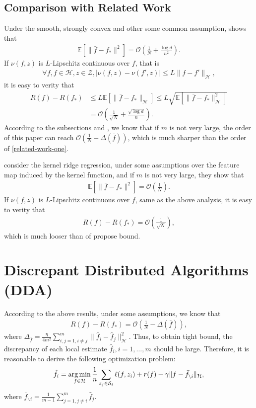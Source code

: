 \documentclass{article}
\newcommand{\argmin}{\operatornamewithlimits{arg\,min}}
\begin{document}
\subsection{Comparison with Related Work}
Under the smooth, strongly convex and other some common assumption,
\cite{zhang2012communication} shows that
\begin{align}
  \mathbb{E}\left[\|\bar{f}-f_\ast\|^2\right]=\mathcal{O}\left(\frac{1}{N}+\frac{\log d}{n^2}\right).
\end{align}
If $\nu(f,z)$ is $L$-Lipschitz continuous over $f$, that is
\begin{align*}
  \forall f, f\in \mathcal{H}, z\in\mathcal{Z}, |\nu(f,z)-\nu(f',z)|\leq L\|f-f'\|_\mathcal{H},
\end{align*}
it is easy to verity that
\begin{align}
  \nonumber R(f)-R(f_\ast)&\leq L\mathbb{E}\left[\|\bar{f}-f_\ast\|_\mathcal{H}\right]\leq L\sqrt{\mathbb{E}\left[\|\bar{f}-f_\ast\|^2_\mathcal{H}\right]}\\
  \label{related-work-one}    &= \mathcal{O}\left(\frac{1}{\sqrt{N}}+\frac{\sqrt{\log d}}{n}\right).
\end{align}
According to the subsections \label{subsection-3.1} and \label{subsection-3.2},
we know that if $m$ is not very large,
the order of this paper can reach $\mathcal{O}\left(\frac{1}{N}-\Delta(\bar{f})\right)$,
which is much sharper than the order of \eqref{related-work-one}.

\cite{Zhang2013} consider the kernel ridge regression, under some assumptions over the feature map induced by the kernel function,
and if $m$ is not very large,
they show that
\begin{align*}
   \mathbb{E}\left[\|\bar{f}-f_\ast\|^2\right]=\mathcal{O}\left(\frac{1}{N}\right).
\end{align*}
If $\nu(f,z)$ is $L$-Lipschitz continuous over $f$,
same as the above analysis,
it is easy to verity that
\begin{align*}
  R(f)-R(f_\ast)=\mathcal{O}\left(\frac{1}{\sqrt{N}}\right),
\end{align*}
which is much looser than of propose bound.
\section{Discrepant Distributed Algorithms (DDA)}
According to the above results, under some assumptions, we know that
  \begin{align*}
     R(f)-R(f_\ast)=\mathcal{O}\left(\frac{1}{N}-\Delta(\bar{f})\right),
\end{align*}
where $\Delta_{\bar{f}}=\frac{\eta}{4m^2}\sum_{i,j=1,i\not=j}^m\|\hat{f}_i-\hat{f}_j\|_\mathcal{H}^2$.
Thus, to obtain tight bound, the discrepancy of each local estimate $\hat{f}_i, i=1,\ldots,m$ should be large.
Therefore, it is reasonable to derive the following optimization problem:
\begin{align}
  \label{opt-problem}
  \hat{f}_i=\argmin_{f\in\mathcal{H}}\frac{1}{n}\sum_{z_j\in\mathcal{S}_i}\ell(f,z_i)+r(f)-\gamma \|f-\bar{f}_{\backslash i}\|_\mathcal{H},
\end{align}
where $\bar{f}_{\backslash i}=\frac{1}{m-1}\sum_{j=1,j\not =i}^m\hat{f}_j$.
\end{document}
